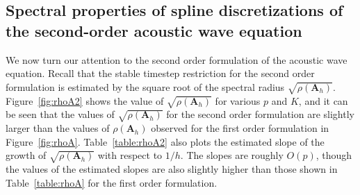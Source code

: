 \documentclass[preprint,10pt]{elsarticle}
\newcommand{\LRp}[1]{\left( #1 \right)}
\newcommand{\reviewerTwo}[1]{#1}
\begin{document}
\subsection{Spectral properties of spline discretizations of the second-order acoustic wave equation}
\label{sec:eigerr}


\reviewerTwo{We now turn our attention to the second order formulation of the acoustic wave equation.  
Recall that the stable timestep restriction for the second order formulation is estimated by the square root of the spectral radius $\sqrt{\rho\LRp{\bm{A}_h}}$.  Figure~\ref{fig:rhoA2} shows the value of $\sqrt{\rho\LRp{\bm{A}_h}}$ for various $p$ and $K$, and it can be seen that the values of $\sqrt{\rho\LRp{\bm{A}_h}}$ for the second order formulation are slightly larger than the values of $\rho\LRp{\bm{A}_h}$ observed for the first order formulation in Figure~\ref{fig:rhoA}.  Table~\ref{table:rhoA2} also plots the estimated slope of the growth of $\sqrt{\rho\LRp{\bm{A}_h}}$ with respect to $1/h$.  The slopes are roughly $O(p)$, though the values of the estimated slopes are also slightly higher than those shown in Table~\ref{table:rhoA} for the first order formulation.
}
\end{document}
